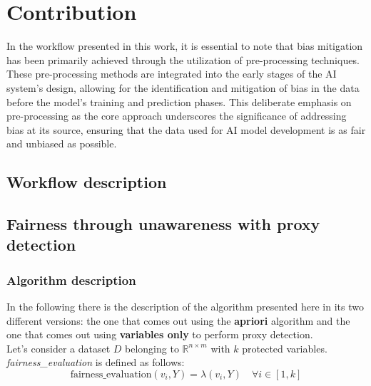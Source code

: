 \documentclass[12pt,a4paper,openright,twoside]{book}
\begin{document}
%

\chapter{Contribution} %
\label{chap:contibution}
In the workflow presented in this work, it is essential to note that bias mitigation has been primarily achieved through the utilization of pre-processing techniques. These pre-processing methods are integrated into the early stages of the AI system's design, allowing for the identification and mitigation of bias in the data before the model's training and prediction phases. This deliberate emphasis on pre-processing as the core approach underscores the significance of addressing bias at its source, ensuring that the data used for AI model development is as fair and unbiased as possible.

\section{Workflow description}

\section{Fairness through unawareness with proxy detection}

\subsection{Algorithm description}
In the following there is the description of the algorithm presented here in its two different versions: the one that comes out using the \textbf{apriori} algorithm and the one that comes out using \textbf{variables only} to perform proxy detection. \\

Let's consider a dataset \( D \) belonging to \( \mathbb{R}^{n \times m} \) with \( k \) protected variables. \\

\textit{fairness\_evaluation} is defined as follows:
\[
\text{fairness\_evaluation}(v_i, Y) = \lambda(v_i, Y) \quad \forall i \in [1, k]
\]
\end{document}
